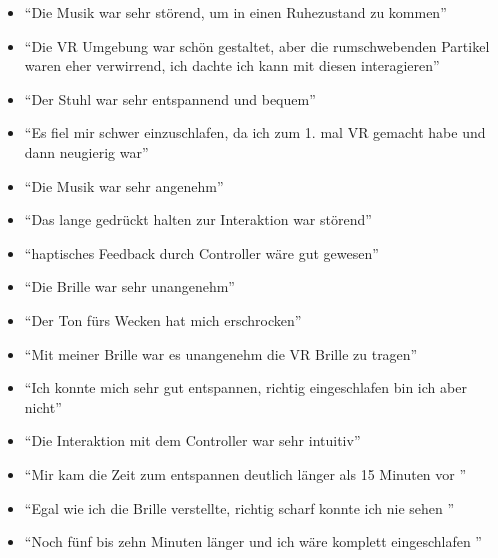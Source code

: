 \begin{itemize}
	\label{lis:comments}
	\item "`Die Musik war sehr störend, um in einen Ruhezustand zu kommen"'
	\item "`Die VR Umgebung war schön gestaltet, aber die rumschwebenden Partikel waren eher verwirrend, ich dachte ich kann mit diesen interagieren"'
	\item "`Der Stuhl war sehr entspannend und bequem"'
	\item "`Es fiel mir schwer einzuschlafen, da ich zum 1. mal VR gemacht habe und dann neugierig war"'
	\item "`Die Musik war sehr angenehm"'
	\item "`Das lange gedrückt halten zur Interaktion war störend"'
	\item "`haptisches Feedback durch Controller wäre gut gewesen"'
	\item "`Die Brille war sehr unangenehm"'
	\item "`Der Ton fürs Wecken hat mich erschrocken"'
	\item "`Mit meiner Brille war es unangenehm die VR Brille zu tragen"'
	\item "`Ich konnte mich sehr gut entspannen, richtig eingeschlafen bin ich      aber nicht"'
	\item "`Die Interaktion mit dem Controller war sehr intuitiv"'
	\item "`Mir kam die Zeit zum entspannen deutlich länger als 15 Minuten vor "'
	\item "`Egal wie ich die Brille verstellte, richtig scharf konnte ich nie sehen "'
	\item "`Noch fünf bis zehn Minuten länger und ich wäre komplett eingeschlafen "'
\end{itemize}

